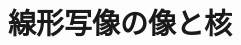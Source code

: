 \documentclass[../../topic_linear-algebra]{subfiles}
\begin{document}
\chapter{線形写像の像と核}



\end{document}
